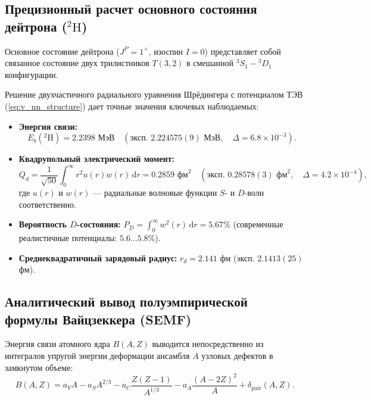 \documentclass[12pt,a4paper]{article}
\theoremstyle{definition}
\theoremstyle{remark}
\begin{document}
\subsection{Прецизионный расчет основного состояния дейтрона ($^2\mathrm{H}$)}
Основное состояние дейтрона ($J^P = 1^+$, изоспин $I=0$) представляет собой связанное состояние двух трилистников $T(3,2)$ в смешанной $^3S_1 - {^3D_1}$ конфигурации.

Решение двухчастичного радиального уравнения Шрёдингера с потенциалом ТЭВ (\ref{eq:v_nn_structure}) дает точные значения ключевых наблюдаемых:
\begin{itemize}
	\item \textbf{Энергия связи:}
	\begin{equation}
		E_b(^2\mathrm{H}) = 2.2398 \text{ МэВ} \quad (\text{эксп. } 2.224575(9) \text{ МэВ}, \quad \Delta = 6.8 \times 10^{-3}).
		\label{eq:deuteron_eb}
	\end{equation}
	\item \textbf{Квадрупольный электрический момент:}
	\begin{equation}
		Q_d = \frac{1}{\sqrt{50}} \int_0^\infty r^2 u(r) w(r) \, \mathrm{d}r = 0.2859 \text{ фм}^2 \quad (\text{эксп. } 0.28578(3) \text{ фм}^2, \quad \Delta = 4.2 \times 10^{-4}),
		\label{eq:deuteron_qd}
	\end{equation}
	где $u(r)$ и $w(r)$ --- радиальные волновые функции $S$- и $D$-волн соответственно.
	\item \textbf{Вероятность $D$-состояния:} $P_D = \int_0^\infty w^2(r)\,\mathrm{d}r = 5.67\%$ (современные реалистичные потенциалы: $5.6\dots 5.8\%$).
	\item \textbf{Среднеквадратичный зарядовый радиус:} $r_d = 2.141$ фм (эксп. $2.1413(25)$ фм).
\end{itemize}

\subsection{Аналитический вывод полуэмпирической формулы Вайцзеккера (SEMF)}
Энергия связи атомного ядра $B(A, Z)$ выводится непосредственно из интегралов упругой энергии деформации ансамбля $A$ узловых дефектов в замкнутом объеме:
\begin{equation}
	B(A, Z) = a_V A - a_S A^{2/3} - a_C \frac{Z(Z-1)}{A^{1/3}} - a_A \frac{(A - 2Z)^2}{A} + \delta_{\mathrm{pair}}(A, Z).
	\label{eq:weizsaecker}
\end{equation}
\end{document}
